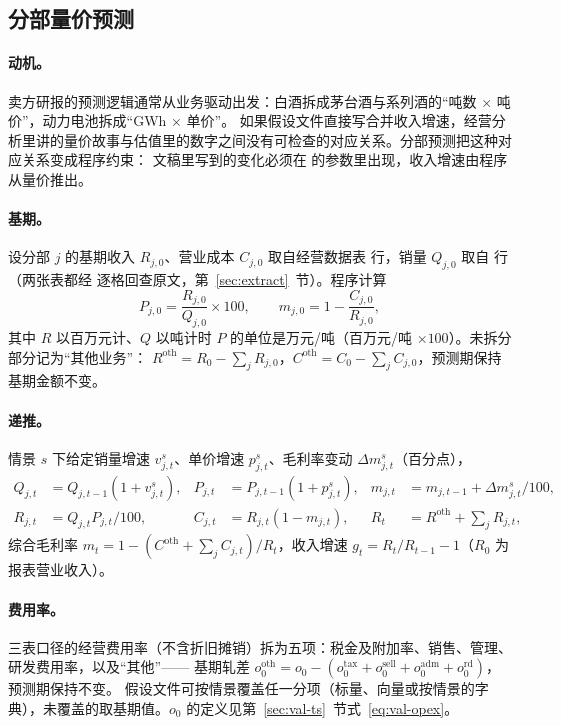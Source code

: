 \subsection{分部量价预测}
\label{sec:val-segment}

\paragraph{动机。} 卖方研报的预测逻辑通常从业务驱动出发：白酒拆成茅台酒与系列酒的“吨数 × 吨价”，动力电池拆成“GWh × 单价”。
如果假设文件直接写合并收入增速，经营分析里讲的量价故事与估值里的数字之间没有可检查的对应关系。分部预测把这种对应关系变成程序约束：
文稿里写到的变化必须在  的参数里出现，收入增速由程序从量价推出。

\paragraph{基期。} 设分部 $j$ 的基期收入 $R_{j,0}$、营业成本 $C_{j,0}$ 取自经营数据表  行，销量 $Q_{j,0}$ 取自  行
（两张表都经  逐格回查原文，第~\ref{sec:extract}~节）。程序计算
\begin{equation}
P_{j,0}=\frac{R_{j,0}}{Q_{j,0}}\times 100,\qquad m_{j,0}=1-\frac{C_{j,0}}{R_{j,0}},
\label{eq:val-seg-base}
\end{equation}
其中 $R$ 以百万元计、$Q$ 以吨计时 $P$ 的单位是万元/吨（百万元/吨 $\times 100$）。未拆分部分记为“其他业务”：
$R^{\text{oth}}=R_0-\sum_j R_{j,0}$，$C^{\text{oth}}=C_0-\sum_j C_{j,0}$，预测期保持基期金额不变。

\paragraph{递推。} 情景 $s$ 下给定销量增速 $v_{j,t}^s$、单价增速 $p_{j,t}^s$、毛利率变动 $\Delta m_{j,t}^s$（百分点），
\begin{align}
Q_{j,t}&=Q_{j,t-1}(1+v_{j,t}^s), & P_{j,t}&=P_{j,t-1}(1+p_{j,t}^s), & m_{j,t}&=m_{j,t-1}+\Delta m^s_{j,t}/100,\\
R_{j,t}&=Q_{j,t}P_{j,t}/100, & C_{j,t}&=R_{j,t}(1-m_{j,t}), &
R_t&=R^{\text{oth}}+\textstyle\sum_j R_{j,t},
\end{align}
综合毛利率 $m_t=1-(C^{\text{oth}}+\sum_j C_{j,t})/R_t$，收入增速 $g_t=R_t/R_{t-1}-1$（$R_0$ 为报表营业收入）。

\paragraph{费用率。} 三表口径的经营费用率（不含折旧摊销）拆为五项：税金及附加率、销售、管理、研发费用率，以及“其他”——
基期轧差 $o^{\text{oth}}_0 = o_0 - (o^{\text{tax}}_0+o^{\text{sell}}_0+o^{\text{adm}}_0+o^{\text{rd}}_0)$，预测期保持不变。
假设文件可按情景覆盖任一分项（标量、向量或按情景的字典），未覆盖的取基期值。$o_0$ 的定义见第~\ref{sec:val-ts}~节式~\eqref{eq:val-opex}。

